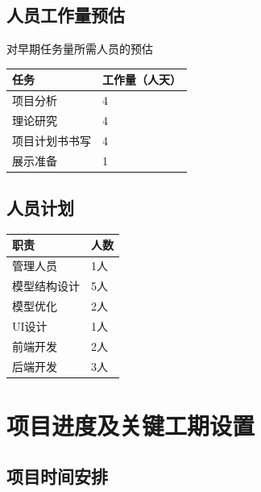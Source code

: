 \documentclass[hyperref, a4paper]{ctexart}
\begin{document}
\hypertarget{ux4ebaux5458ux5de5ux4f5cux91cfux9884ux4f30}{%
\subsection{人员工作量预估}\label{ux4ebaux5458ux5de5ux4f5cux91cfux9884ux4f30}}

对早期任务量所需人员的预估

\begin{longtable}[]{@{}ll@{}}
\toprule
任务 & 工作量（人天）\tabularnewline
\midrule
\endhead
项目分析 & 4\tabularnewline
理论研究 & 4\tabularnewline
项目计划书书写 & 4\tabularnewline
展示准备 & 1\tabularnewline
\bottomrule
\end{longtable}

\hypertarget{ux4ebaux5458ux8ba1ux5212}{%
\subsection{人员计划}\label{ux4ebaux5458ux8ba1ux5212}}

\begin{longtable}[]{@{}ll@{}}
\toprule
职责 & 人数\tabularnewline
\midrule
\endhead
管理人员 & 1人\tabularnewline
模型结构设计 & 5人\tabularnewline
模型优化 & 2人\tabularnewline
UI设计 & 1人\tabularnewline
前端开发 & 2人\tabularnewline
后端开发 & 3人\tabularnewline
\bottomrule
\end{longtable}

\hypertarget{ux9879ux76eeux8fdbux5ea6ux53caux5173ux952eux5de5ux671fux8bbeux7f6e}{%
\section{项目进度及关键工期设置}\label{ux9879ux76eeux8fdbux5ea6ux53caux5173ux952eux5de5ux671fux8bbeux7f6e}}

\hypertarget{ux9879ux76eeux65f6ux95f4ux5b89ux6392}{%
\subsection{项目时间安排}\label{ux9879ux76eeux65f6ux95f4ux5b89ux6392}}
\end{document}
